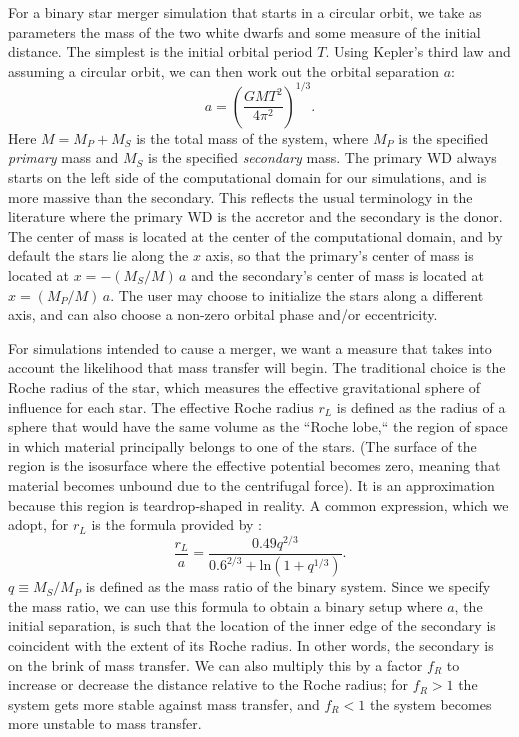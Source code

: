 \documentclass[12pt]{article}
\begin{document}
For a binary star merger simulation that starts in a circular orbit,
we take as parameters the mass of the two white dwarfs and some measure
of the initial distance. The simplest is the initial orbital period $T$.
Using Kepler's third law and assuming a circular orbit, we can then work
out the orbital separation $a$:
\begin{equation}
  a = \left(\frac{GM T^2}{4\pi^2}\right)^{1/3}.
\end{equation}
Here $M = M_P + M_S$ is the total mass of the system, where $M_P$ is
the specified \textit{primary} mass and $M_S$ is the specified
\textit{secondary} mass. The primary WD always starts on the left
side of the computational domain for our simulations, and is more
massive than the secondary. This reflects the usual terminology in the
literature where the primary WD is the accretor and the secondary is
the donor. The center of mass is located at the center of the
computational domain, and by default the stars lie along the $x$ axis, so that
the primary's center of mass is located at $x = -(M_S / M)\, a$ and
the secondary's center of mass is located at $x = (M_P / M)\, a$.
The user may choose to initialize the stars along a different axis,
and can also choose a non-zero orbital phase and/or eccentricity.

For simulations intended to cause a merger, we want a measure that takes
into account the likelihood that mass transfer will begin. The traditional
choice is the Roche radius of the star, which measures the effective gravitational
sphere of influence for each star. The effective Roche radius $r_L$ is defined as
the radius of a sphere that would have the same volume as the ``Roche lobe,`` the
region of space in which material principally belongs to one of the stars. (The surface
of the region is the isosurface where the effective potential becomes zero, meaning
that material becomes unbound due to the centrifugal force). It is
an approximation because this region is teardrop-shaped in reality. A common
expression, which we adopt, for $r_L$ is
the formula provided by \citet{eggleton:1983}:
\begin{equation}
  \frac{r_L}{a} = \frac{0.49 q^{2/3}}{0.6^{2/3} + \text{ln}(1 + q^{1/3})}.
\end{equation}
$q \equiv M_S / M_P$ is defined as the mass ratio of the binary system. Since
we specify the mass ratio, we can use this formula to obtain a binary setup where $a$,
the initial separation, is such that the location of the inner edge of the secondary
is coincident with the extent of its Roche radius.
In other words, the secondary is on the brink of mass transfer. We can also multiply this
by a factor $f_R$ to increase or decrease the distance relative to the Roche radius; for
$f_R > 1$ the system gets more stable against mass transfer, and $f_R < 1$ the system becomes
more unstable to mass transfer.
\end{document}
